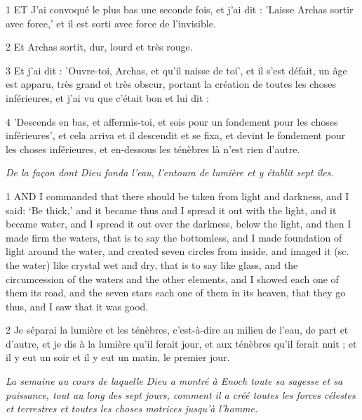 \par 1 ET J'ai convoqué le plus bas une seconde fois, et j'ai dit : 'Laisse Archas sortir avec force,' et il est sorti avec force de l'invisible.

\par 2 Et Archas sortit, dur, lourd et très rouge.

\par 3 Et j'ai dit : 'Ouvre-toi, Archas, et qu'il naisse de toi', et il s'est défait, un âge est apparu, très grand et très obscur, portant la création de toutes les choses inférieures, et j'ai vu que c'était bon et lui dit :

\par 4 'Descends en bas, et affermis-toi, et sois pour un fondement pour les choses inférieures', et cela arriva et il descendit et se fixa, et devint le fondement pour les choses inférieures, et en-dessous les ténèbres là n'est rien d'autre.




\par \textit{De la façon dont Dieu fonda l'eau, l'entoura de lumière et y établit sept îles.}

\par 1 AND I commanded that there should be taken from light and darkness, and I said: ‘Be thick,’ and it became thus and I spread it out with the light, and it became water, and I spread it out over the darkness, below the light, and then I made firm the waters, that is to say the bottomless, and I made foundation of light around the water, and created seven circles from inside, and imaged it (sc. the water) like crystal wet and dry, that is to say like glass, and the circumcession of the waters and the other elements, and I showed each one of them its road, and the seven stars each one of them in its heaven, that they go thus, and I saw that it was good.

\par 2 Je séparai la lumière et les ténèbres, c'est-à-dire au milieu de l'eau, de part et d'autre, et je dis à la lumière qu'il ferait jour, et aux ténèbres qu'il ferait nuit ; et il y eut un soir et il y eut un matin, le premier jour.


\par \textit{La semaine au cours de laquelle Dieu a montré à Enoch toute sa sagesse et sa puissance, tout au long des sept jours, comment il a créé toutes les forces célestes et terrestres et toutes les choses motrices jusqu'à l'homme.}


